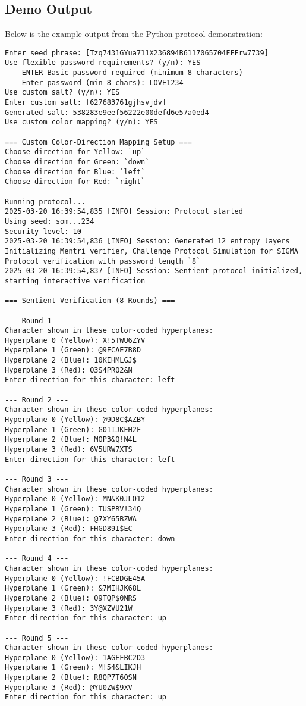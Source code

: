 \documentclass[10pt,twocolumn]{article}
\begin{document}
\subsection{Demo Output}
Below is the example output from the Python protocol demonstration:
\begin{lstlisting}
Enter seed phrase: [Tzq7431GYua711X236894B6117065704FFFrw7739]
Use flexible password requirements? (y/n): YES
    ENTER Basic password required (minimum 8 characters)
    Enter password (min 8 chars): LOVE1234
Use custom salt? (y/n): YES
Enter custom salt: [627683761gjhsvjdv]
Generated salt: 538283e9eef56222e00defd6e57a0ed4
Use custom color mapping? (y/n): YES

=== Custom Color-Direction Mapping Setup ===
Choose direction for Yellow: `up`
Choose direction for Green: `down`
Choose direction for Blue: `left`
Choose direction for Red: `right`

Running protocol...
2025-03-20 16:39:54,835 [INFO] Session: Protocol started
Using seed: som...234
Security level: 10
2025-03-20 16:39:54,836 [INFO] Session: Generated 12 entropy layers
Initializing Mentri verifier, Challenge Protocol Simulation for SIGMA Protocol verification with password length `8`
2025-03-20 16:39:54,837 [INFO] Session: Sentient protocol initialized, starting interactive verification

=== Sentient Verification (8 Rounds) ===

--- Round 1 ---
Character shown in these color-coded hyperplanes:
Hyperplane 0 (Yellow): X!5TWU6ZYV
Hyperplane 1 (Green): @9FCAE7B8D
Hyperplane 2 (Blue): 10KIHMLGJ$
Hyperplane 3 (Red): Q3S4PRO2&N
Enter direction for this character: left

--- Round 2 ---
Character shown in these color-coded hyperplanes:
Hyperplane 0 (Yellow): @9D8C$AZBY
Hyperplane 1 (Green): G01IJKEH2F
Hyperplane 2 (Blue): MOP3&Q!N4L
Hyperplane 3 (Red): 6V5URW7XTS
Enter direction for this character: left

--- Round 3 ---
Character shown in these color-coded hyperplanes:
Hyperplane 0 (Yellow): MN&K0JLO12
Hyperplane 1 (Green): TUSPRV!34Q
Hyperplane 2 (Blue): @7XY65BZWA
Hyperplane 3 (Red): FHGD89I$EC
Enter direction for this character: down

--- Round 4 ---
Character shown in these color-coded hyperplanes:
Hyperplane 0 (Yellow): !FCBDGE45A
Hyperplane 1 (Green): &7MIHJK68L
Hyperplane 2 (Blue): O9TQP$0NRS
Hyperplane 3 (Red): 3Y@XZVU21W
Enter direction for this character: up

--- Round 5 ---
Character shown in these color-coded hyperplanes:
Hyperplane 0 (Yellow): 1AGEFBC2D3
Hyperplane 1 (Green): M!54&LIKJH
Hyperplane 2 (Blue): R8QP7T6OSN
Hyperplane 3 (Red): @YU0ZW$9XV
Enter direction for this character: up


\end{lstlisting}
\end{document}
